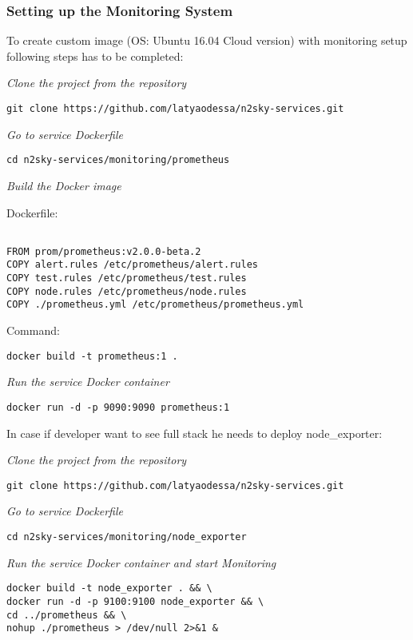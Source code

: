 \subsubsection{Setting up the Monitoring System}\label{Monitoring System setup}

To create custom image (OS: Ubuntu 16.04 Cloud version) with monitoring setup following steps has to be completed:

\emph{Clone the project from the repository}
 \begin{lstlisting}
git clone https://github.com/latyaodessa/n2sky-services.git 
\end{lstlisting}


\emph{Go to service Dockerfile}
 \begin{lstlisting}
cd n2sky-services/monitoring/prometheus
\end{lstlisting}

\emph{Build the Docker image}

Dockerfile:
 \begin{lstlisting}

FROM prom/prometheus:v2.0.0-beta.2
COPY alert.rules /etc/prometheus/alert.rules
COPY test.rules /etc/prometheus/test.rules
COPY node.rules /etc/prometheus/node.rules
COPY ./prometheus.yml /etc/prometheus/prometheus.yml

\end{lstlisting}

Command: 

 \begin{lstlisting}
docker build -t prometheus:1 .
\end{lstlisting}


\emph{Run the service Docker container}
 \begin{lstlisting}
docker run -d -p 9090:9090 prometheus:1
\end{lstlisting}


In case if developer want to see full stack he needs to deploy node\_exporter:

\emph{Clone the project from the repository}
 \begin{lstlisting}
git clone https://github.com/latyaodessa/n2sky-services.git 
\end{lstlisting}


\emph{Go to service Dockerfile}
 \begin{lstlisting}
cd n2sky-services/monitoring/node_exporter 
\end{lstlisting}

\emph{Run the service Docker container and start Monitoring}
 \begin{lstlisting}
docker build -t node_exporter . && \
docker run -d -p 9100:9100 node_exporter && \
cd ../prometheus && \
nohup ./prometheus > /dev/null 2>&1 &
\end{lstlisting}



